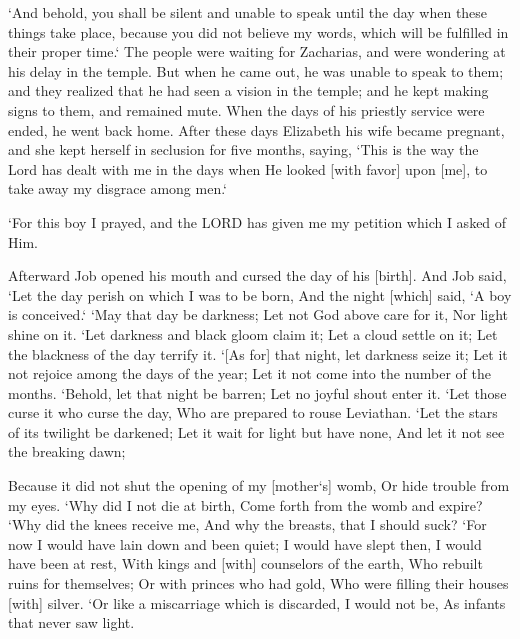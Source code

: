 \begin{scripture}[Luke 1:20-25]
    `And behold, you shall be silent and unable to speak until the day when these things take place, because you did not believe my words, which will be fulfilled in their proper time.`
    The people were waiting for Zacharias, and were wondering at his delay in the temple.
    But when he came out, he was unable to speak to them; and they realized that he had seen a vision in the temple; and he kept making signs to them, and remained mute.
    When the days of his priestly service were ended, he went back home.
    After these days Elizabeth his wife became pregnant, and she kept herself in seclusion for five months, saying,
    `This is the way the Lord has dealt with me in the days when He looked [with favor] upon [me], to take away my disgrace among men.`
\end{scripture}

\begin{scripture}[1 Samuel 1:27]
    `For this boy I prayed, and the LORD has given me my petition which I asked of Him.
\end{scripture}

\begin{scripture}[Job 3:1-9]
    Afterward Job opened his mouth and cursed the day of his [birth].
    And Job said,
    `Let the day perish on which I was to be born, And the night [which] said, `A boy is conceived.`
    `May that day be darkness; Let not God above care for it, Nor light shine on it.
    `Let darkness and black gloom claim it; Let a cloud settle on it; Let the blackness of the day terrify it.
    `[As for] that night, let darkness seize it; Let it not rejoice among the days of the year; Let it not come into the number of the months.
    `Behold, let that night be barren; Let no joyful shout enter it.
    `Let those curse it who curse the day, Who are prepared to rouse Leviathan.
    `Let the stars of its twilight be darkened; Let it wait for light but have none, And let it not see the breaking dawn;
\end{scripture}

\begin{scripture}[Job 3:10-16]
    Because it did not shut the opening of my [mother`s] womb, Or hide trouble from my eyes.
    `Why did I not die at birth, Come forth from the womb and expire?
    `Why did the knees receive me, And why the breasts, that I should suck?
    `For now I would have lain down and been quiet; I would have slept then, I would have been at rest,
    With kings and [with] counselors of the earth, Who rebuilt ruins for themselves;
    Or with princes who had gold, Who were filling their houses [with] silver.
    `Or like a miscarriage which is discarded, I would not be, As infants that never saw light.
\end{scripture}

